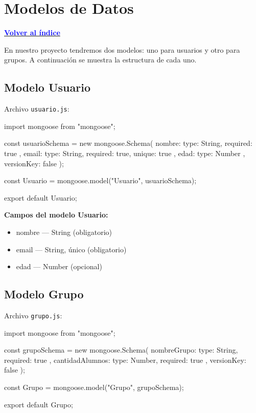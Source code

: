 \documentclass[12pt,a4paper]{article}
\newcommand{\volverindice}{\noindent\hyperlink{toc}{\textcolor{blue}{\textbf{Volver al índice}}}\par\vspace{0.5cm}}
\begin{document}
\section{Modelos de Datos}
\volverindice

En nuestro proyecto tendremos dos modelos: uno para usuarios y otro para grupos. A continuación se muestra la estructura de cada uno.

\subsection{Modelo Usuario}

Archivo \texttt{usuario.js}:

\begin{codeblock}[language=JavaScript]
import mongoose from "mongoose";

const usuarioSchema = new mongoose.Schema({
  nombre: { type: String, required: true },
  email: { type: String, required: true, unique: true },
  edad: { type: Number }
}, {
  versionKey: false
});

const Usuario = mongoose.model("Usuario", usuarioSchema);

export default Usuario;
\end{codeblock}

\textbf{Campos del modelo Usuario:}

\begin{itemize}
    \item nombre — String (obligatorio)
    \item email — String, único (obligatorio)
    \item edad — Number (opcional)
\end{itemize}

\subsection{Modelo Grupo}

Archivo \texttt{grupo.js}:

\begin{codeblock}[language=JavaScript]
import mongoose from "mongoose";

const grupoSchema = new mongoose.Schema({
  nombreGrupo: { type: String, required: true },
  cantidadAlumnos: { type: Number, required: true }
}, {
  versionKey: false
});

const Grupo = mongoose.model("Grupo", grupoSchema);

export default Grupo;
\end{codeblock}
\end{document}
